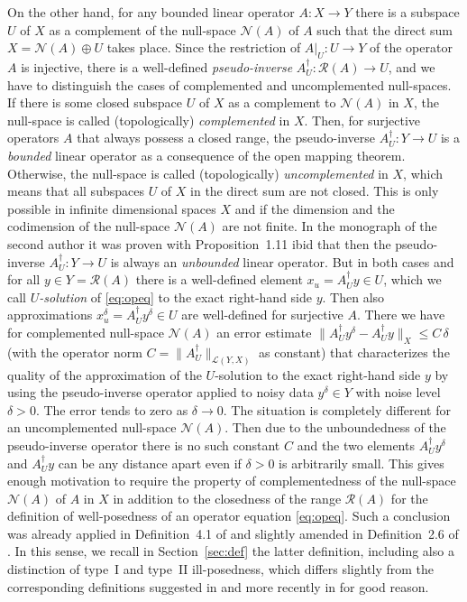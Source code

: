 \documentclass[12pt,twoside,reqno]{amsart}
\theoremstyle{definition}
\numberwithin{equation}{section}
\begin{document}
On the other hand, for any bounded linear operator $A: X \to Y$ there is a subspace $U$ of $X$ as a complement of the null-space $\mathcal{N}(A)$ of $A$ such that
the direct sum  $X=\mathcal{N}(A) \oplus U$ takes place. Since the restriction of $A|_U: U \to Y$ of the operator $A$ is injective, there is a well-defined \emph{pseudo-inverse} $A_U^\dagger: \mathcal{R}(A) \to U$, and we have to distinguish the cases of complemented and uncomplemented null-spaces.
If there is some closed subspace $U$ of $X$ as a complement to $\mathcal{N}(A)$ in $X$, the null-space is called (topologically) \emph{complemented} in $X$. Then, for
surjective operators $A$ that always possess a closed range, the pseudo-inverse $A_U^\dagger: Y \to U$ is a \emph{bounded} linear operator as a consequence of the open mapping theorem. Otherwise, the null-space is called (topologically) \emph{uncomplemented} in $X$, which means that all subspaces $U$ of $X$ in the direct sum are not closed. This is only possible in infinite dimensional spaces $X$ and if the dimension and the codimension of the null-space $\mathcal{N}(A)$ are not finite. In the monograph \cite{Flemmingbuch18} of the second author it was proven with Proposition~1.11 ibid that then the pseudo-inverse $A_U^\dagger: Y \to U$ is always an \emph{unbounded} linear operator. But in both cases and for all $y \in Y=\mathcal{R}(A)$ there is a well-defined element
$x_u=A_U^\dagger y \in U$, which we call \emph{$U$-solution} of \eqref{eq:opeq} to the exact right-hand side $y$. Then also approximations $x^\delta_u=A_U^\dagger y^\delta \in U$ are well-defined for surjective $A$. There we have for complemented null-space $\mathcal{N}(A)$ an error estimate $\|A_U^\dagger y^\delta-A_U^\dagger y\|_X \le C \,\delta$ (with the operator norm $C=\|A_U^\dagger\|_{\mathcal{L}(Y,X)}$ as constant) that characterizes the quality of the approximation of the $U$-solution to the exact right-hand side $y$ by using the pseudo-inverse operator applied to noisy data $y^\delta \in Y$ with noise level $\delta>0$. The error tends to zero as $\delta \to 0$. The situation is completely different for an uncomplemented null-space $\mathcal{N}(A)$. Then due to the unboundedness of the pseudo-inverse operator there is no such constant $C$ and the two elements $A_U^\dagger y^\delta$ and $A_U^\dagger y$ can be any distance apart even if $\delta>0$ is arbitrarily small. This gives enough motivation to require the property of complementedness of the null-space $\mathcal{N}(A)$ of $A$ in $X$ in addition to the closedness of the range $\mathcal{R}(A)$ for the definition of well-posedness of an operator equation \eqref{eq:opeq}. Such a conclusion was already applied in Definition~4.1 of \cite{HofKin25} and slightly amended in Definition~2.6 of \cite{FleHof25}. In this sense, we recall in Section~\ref{sec:def} the latter definition, including also a distinction of type~I and type~II ill-posedness, which differs slightly from the corresponding definitions suggested in \cite{Nashed86} and more recently in \cite{HofKin25} for good reason.
\end{document}
